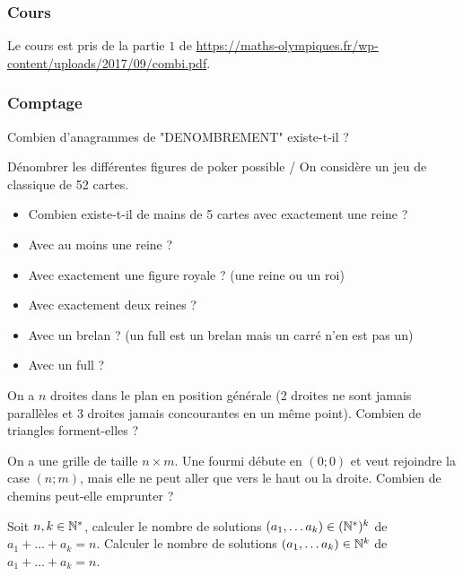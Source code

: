 \subsubsection{Cours}

Le cours est pris de la partie $1$ de \url{https://maths-olympiques.fr/wp-content/uploads/2017/09/combi.pdf}.

\subsubsection{Comptage}

\begin{exo}
Combien d'anagrammes de "DENOMBREMENT" existe-t-il ?
\end{exo}

\begin{exo}
Dénombrer les différentes figures de poker possible / On considère un jeu de classique de 52 cartes.
\begin{itemize}
    \item Combien existe-t-il de mains de 5 cartes avec exactement une reine ?
    \item Avec au moins une reine ?
    \item Avec exactement une figure royale ? (une reine ou un roi)
    \item Avec exactement deux reines ?
    \item Avec un brelan ? (un full est un brelan mais un carré n'en est pas un)
    \item Avec un full ?
\end{itemize}
\end{exo}

\begin{exo}
On a $n$ droites dans le plan en position générale (2 droites ne sont jamais parallèles et 3 droites jamais concourantes en un même point). Combien de triangles forment-elles ?
\end{exo}

\begin{exo}
On a une grille de taille $n \times m$. Une fourmi débute en $(0;0)$ et veut rejoindre la case $(n;m)$, mais elle ne peut aller que vers le haut ou la droite. Combien de chemins peut-elle emprunter ?
\end{exo}

\vspace{1mm}

\begin{exo}
Soit $n,k\in \mathbb N^*$, calculer le nombre de solutions $(a_1,\dots a_k)\in (\mathbb N^*)^k$ de $a_1+\dots +a_k=n$. Calculer le nombre de solutions $(a_1,\dots a_k)\in \mathbb N^k$ de $a_1+\dots +a_k=n$.
\end{exo}

